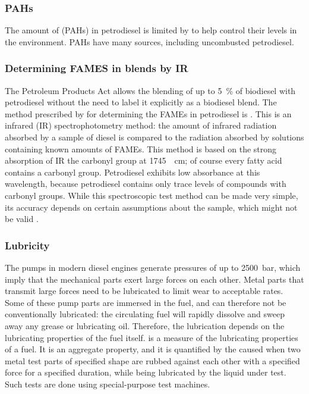 \subsubsection{PAHs}
The amount of  (PAHs) in petrodiesel
is limited by  to help control their levels in the environment.
PAHs have many sources, including uncombusted petrodiesel.

\subsubsection[FAMEs by IR]{Determining FAMES in blends by IR} The Petroleum
Products Act allows the blending of up to \SI{5}{\percent} of biodiesel with
petrodiesel without the need to label it explicitly as a biodiesel blend. The
method prescribed by  for determining the FAMEs in petrodiesel is
. This is an infrared (IR) spectrophotometry method: the amount of
infrared radiation absorbed by a sample of diesel is compared to the radiation
absorbed by solutions containing known amounts of FAMEs. This method is based on
the strong absorption of IR the carbonyl group at \SI{1745}{\per\centi\metre};
of course every fatty acid contains a carbonyl group. Petrodiesel exhibits low
absorbance at this wavelength, because petrodiesel contains only trace levels of
compounds with carbonyl groups. While this spectroscopic test method can be made
very simple, its accuracy depends on certain assumptions about the sample, which
might not be valid \autocite{Pinho2014}.

\subsubsection{Lubricity}
The pumps in modern diesel engines generate pressures of up to \SI{2500}{\bar},
which imply that the mechanical parts exert large forces on each other.
Metal parts that transmit large forces need to be lubricated to limit wear to
acceptable rates. Some of these pump parts are immersed in the fuel, and can
therefore not be conventionally lubricated: the circulating fuel will rapidly
dissolve and sweep away any grease or lubricating oil. Therefore, the
lubrication depends on the lubricating properties of the fuel itself.
 is a measure of the lubricating properties of a fuel. It is
an aggregate property, and it is quantified by the  caused
when two metal test parts of specified shape are rubbed against each other with
a specified force for a specified duration, while being lubricated by the liquid
under test. Such tests are done using special-purpose test machines.

